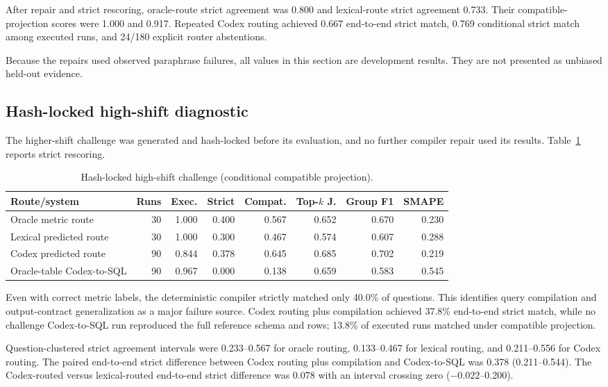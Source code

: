 \documentclass[11pt]{article}
\begin{document}
After repair and strict rescoring, oracle-route strict agreement was 0.800 and
lexical-route strict agreement 0.733. Their compatible-projection scores were
1.000 and 0.917. Repeated Codex routing achieved 0.667 end-to-end strict match,
0.769 conditional strict match among executed runs, and 24/180 explicit router
abstentions.

Because the repairs used observed paraphrase failures, all values in this section
are development results. They are not presented as unbiased held-out evidence.

\subsection{Hash-locked high-shift diagnostic}
The higher-shift challenge was generated and hash-locked before its evaluation,
and no further compiler repair used its results. Table~\ref{tab:shift} reports
strict rescoring.

\begin{table}[h]
\centering\small
\setlength{\tabcolsep}{4pt}
\begin{tabular}{lrrrrrrr}
\toprule
Route/system & Runs & Exec. & Strict & Compat. & Top-$k$ J. & Group F1 & SMAPE \\
\midrule
Oracle metric route & 30 & 1.000 & 0.400 & 0.567 & 0.652 & 0.670 & 0.230 \\
Lexical predicted route & 30 & 1.000 & 0.300 & 0.467 & 0.574 & 0.607 & 0.288 \\
Codex predicted route & 90 & 0.844 & 0.378 & 0.645 & 0.685 & 0.702 & 0.219 \\
Oracle-table Codex-to-SQL & 90 & 0.967 & 0.000 & 0.138 & 0.659 & 0.583 & 0.545 \\
\bottomrule
\end{tabular}
\caption{Hash-locked high-shift challenge (conditional compatible projection).}
\label{tab:shift}
\end{table}

Even with correct metric labels, the deterministic compiler strictly matched only
40.0\% of questions. This identifies query compilation and output-contract
generalization as a major failure source. Codex routing plus compilation achieved
37.8\% end-to-end strict match, while no challenge Codex-to-SQL run reproduced the
full reference schema and rows; 13.8\% of executed runs matched under compatible
projection.

Question-clustered strict agreement intervals were 0.233--0.567 for oracle
routing, 0.133--0.467 for lexical routing, and 0.211--0.556 for Codex routing.
The paired end-to-end strict difference between Codex routing plus compilation and
Codex-to-SQL was 0.378 (0.211--0.544). The Codex-routed versus lexical-routed
end-to-end strict difference was 0.078 with an interval crossing zero
($-0.022$--0.200).
\end{document}
